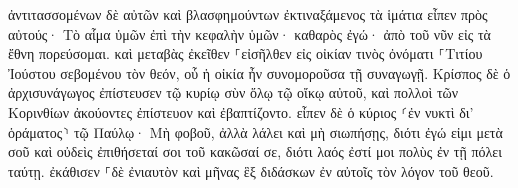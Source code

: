 \documentclass{openreader}
\begin{document}
ἀντιτασσομένων δὲ αὐτῶν καὶ βλασφημούντων ἐκτιναξάμενος τὰ ἱμάτια εἶπεν πρὸς αὐτούς· Τὸ αἷμα ὑμῶν ἐπὶ τὴν κεφαλὴν ὑμῶν· καθαρὸς ἐγώ· ἀπὸ τοῦ νῦν εἰς τὰ ἔθνη πορεύσομαι. 
καὶ μεταβὰς ἐκεῖθεν ⸀εἰσῆλθεν εἰς οἰκίαν τινὸς ὀνόματι ⸀Τιτίου Ἰούστου σεβομένου τὸν θεόν, οὗ ἡ οἰκία ἦν συνομοροῦσα τῇ συναγωγῇ. 
Κρίσπος δὲ ὁ ἀρχισυνάγωγος ἐπίστευσεν τῷ κυρίῳ σὺν ὅλῳ τῷ οἴκῳ αὐτοῦ, καὶ πολλοὶ τῶν Κορινθίων ἀκούοντες ἐπίστευον καὶ ἐβαπτίζοντο. 
εἶπεν δὲ ὁ κύριος ⸂ἐν νυκτὶ δι’ ὁράματος⸃ τῷ Παύλῳ· Μὴ φοβοῦ, ἀλλὰ λάλει καὶ μὴ σιωπήσῃς, 
διότι ἐγώ εἰμι μετὰ σοῦ καὶ οὐδεὶς ἐπιθήσεταί σοι τοῦ κακῶσαί σε, διότι λαός ἐστί μοι πολὺς ἐν τῇ πόλει ταύτῃ. 
ἐκάθισεν ⸀δὲ ἐνιαυτὸν καὶ μῆνας ἓξ διδάσκων ἐν αὐτοῖς τὸν λόγον τοῦ θεοῦ. 
\end{document}
